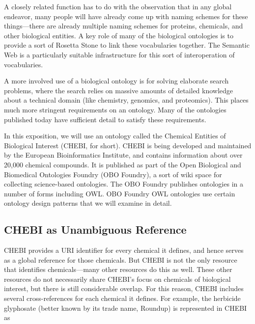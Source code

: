 A closely related function has to do with the observation that in any
global endeavor, many people will have already come up with naming
schemes for these things---there are already multiple naming schemes for
proteins, chemicals, and other biological entities. A key role of many
of the biological ontologies is to provide a sort of Rosetta Stone to
link these vocabularies together. The Semantic Web is a particularly
suitable infrastructure for this sort of interoperation of vocabularies.

A more involved use of a biological ontology is for solving elaborate
search problems, where the search relies on massive amounts of detailed
knowledge about a technical domain (like chemistry, genomics, and
proteomics). This places much more stringent requirements on an
ontology. Many of the ontologies published today have sufficient detail
to satisfy these requirements.

In this exposition, we will use an ontology called the Chemical Entities
of Biological Interest (CHEBI, for short). CHEBI is being developed and
maintained by the European Bioinformatics Institute, and contains
information about over 20,000 chemical compounds. It is published as
part of the Open Biological and Biomedical Ontologies Foundry (OBO
Foundry), a sort of wiki space for collecting science-based ontologies.
The OBO Foundry publishes ontologies in a number of forms including OWL.
OBO Foundry OWL ontologies use certain ontology design patterns that we
will examine in detail.

\subsection{CHEBI as Unambiguous Reference}

CHEBI provides a URI identifier for every chemical it defines, and hence
serves as a global reference for those chemicals. But CHEBI is not the
only resource that identifies chemicals---many other
resources do this as well. These other resources do not necessarily
share CHEBI's focus on chemicals of biological interest, but there is
still considerable overlap. For this reason, CHEBI includes several
cross-references for each chemical it defines. For example, the
herbicide glyphosate (better known by its trade name, Roundup) is
represented in CHEBI as

